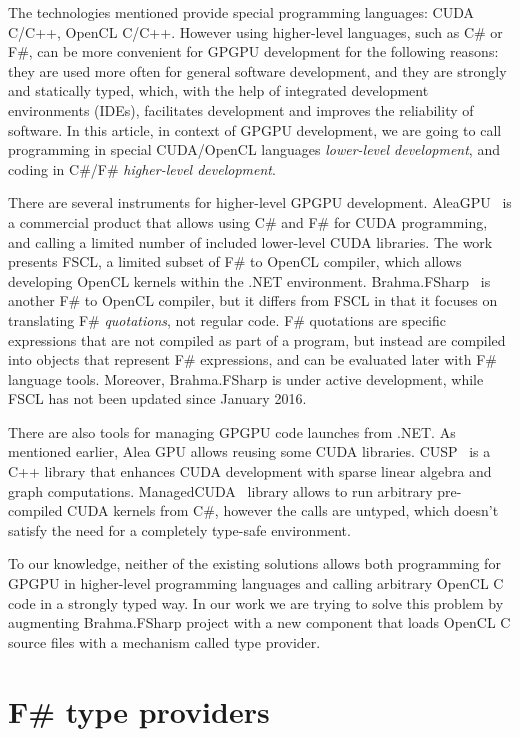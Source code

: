 \documentclass[sigplan,review]{acmart}\settopmatter{printfolios=true}
\begin{document}
The technologies mentioned provide special programming languages: CUDA C/C++, OpenCL C/C++. However using higher-level languages, such as C\# or F\#, can be more convenient for GPGPU development for the following reasons: they are used more often for general software development, and they are strongly and statically typed, which, with the help of integrated development environments (IDEs), facilitates development and improves the reliability of software. In this article, in context of GPGPU development, we are going to call programming in special CUDA/OpenCL languages \textit{lower-level development}, and coding in C\#/F\# \textit{higher-level development}.

There are several instruments for higher-level GPGPU development. AleaGPU~\cite{AleaGPU} is a commercial product that allows using C\# and F\# for CUDA programming, and calling a limited number of included lower-level CUDA libraries. The work~\cite{FSCL} presents FSCL, a limited subset of F\# to OpenCL compiler, which allows developing OpenCL kernels within the .NET environment.
Brahma.FSharp~\cite{Brahma_FSharp} is another F\# to OpenCL compiler, but it differs from FSCL in that it focuses on translating F\# \textit{quotations}, not regular code.
F\# quotations are specific expressions that are not compiled as part of a program, but instead are compiled into objects that represent F\# expressions, and can be evaluated later with F\# language tools.
Moreover, Brahma.FSharp is under active development, while FSCL has not been updated since January 2016.

There are also tools for managing GPGPU code launches from .NET. As mentioned earlier, Alea GPU allows reusing some CUDA libraries. CUSP~\cite{CUSP} is a C++ library that enhances CUDA development with sparse linear algebra and graph computations. ManagedCUDA~\cite{ManagedCUDA} library allows to run arbitrary pre-compiled CUDA kernels from C\#, however the calls are untyped, which doesn't satisfy the need for a completely type-safe environment.

To our knowledge, neither of the existing solutions allows both programming for GPGPU in higher-level programming languages and calling arbitrary OpenCL C code in a strongly typed way. In our work we are trying to solve this problem by augmenting Brahma.FSharp project with a new component that loads OpenCL C source files with a mechanism called type provider.

\section{F\# type providers}
\end{document}
